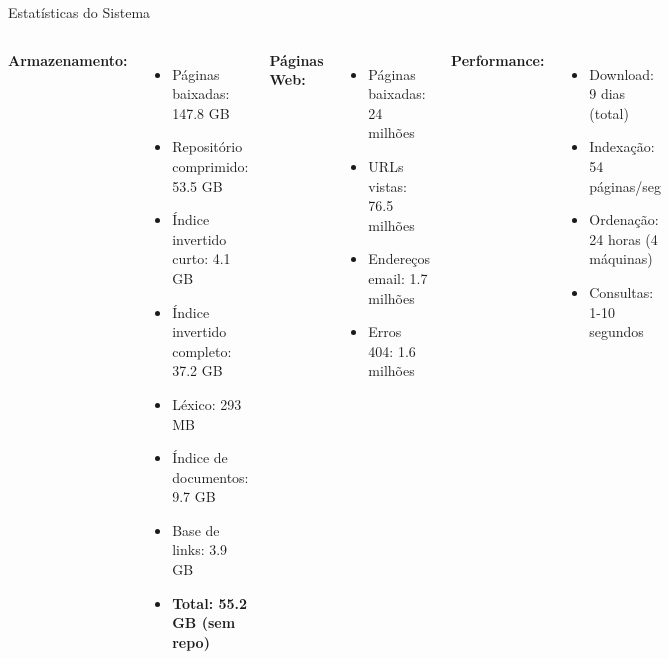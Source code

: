 \documentclass[aspectratio=169]{beamer}
\begin{document}
\begin{frame}{Estatísticas do Sistema}
\begin{columns}
\textbf{Armazenamento:}
\begin{itemize}
\item Páginas baixadas: 147.8 GB
\item Repositório comprimido: 53.5 GB
\item Índice invertido curto: 4.1 GB
\item Índice invertido completo: 37.2 GB
\item Léxico: 293 MB
\item Índice de documentos: 9.7 GB
\item Base de links: 3.9 GB
\item \textbf{Total: 55.2 GB (sem repo)}
\end{itemize}

\textbf{Páginas Web:}
\begin{itemize}
\item Páginas baixadas: 24 milhões
\item URLs vistas: 76.5 milhões
\item Endereços email: 1.7 milhões
\item Erros 404: 1.6 milhões
\end{itemize}

\vspace{0.3cm}
\textbf{Performance:}
\begin{itemize}
\item Download: 9 dias (total)
\item Indexação: 54 páginas/seg
\item Ordenação: 24 horas (4 máquinas)
\item Consultas: 1-10 segundos
\end{itemize}
\end{columns}
\end{frame}
\end{document}
